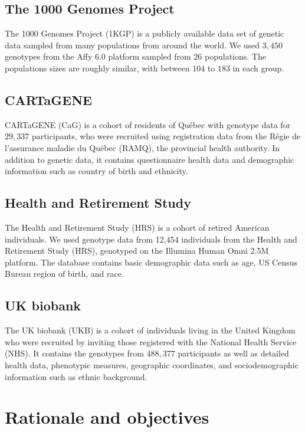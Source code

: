 \subsection{The 1000 Genomes Project}

The 1000 Genomes Project (1KGP) is a publicly available data set of genetic data sampled from many populations from around the world\citep{global_2015}. We used $3,450$ genotypes from the Affy 6.0 platform sampled from $26$  populations. The populations sizes are roughly similar, with between $104$ to $183$ in each group.

\subsection{CARTaGENE}

CARTaGENE (CaG) is a cohort of residents of Qu\'{e}bec with genotype data for $29,337$ participants, who were recruited using registration data from the R\'{e}gie de l’assurance maladie du Qu\'{e}bec (RAMQ), the provincial health authority\citep{awadalla_cohort_2013}. In addition to genetic data, it contains questionnaire health data and demographic information such as country of birth and ethnicity.

\subsection{Health and Retirement Study}

The Health and Retirement Study (HRS) is a cohort of retired American individuals\citep{juster_overview_1995}. We used genotype data from 12,454 individuals from the Health and Retirement Study (HRS), genotyped on the Illumina Human Omni 2.5M platform. The database contains basic demographic data such as age, US Census Bureau region of birth, and race.

\subsection{UK biobank}

The UK biobank (UKB) is a cohort of individuals living in the United Kingdom who were recruited by inviting those registered with the National Health Service (NHS)\citep{sudlow_uk_2015}. It contains the genotypes from $488,377$ participants as well as detailed health data, phenotypic measures, geographic coordinates, and sociodemographic information such as ethnic background.

\section{Rationale and objectives}






